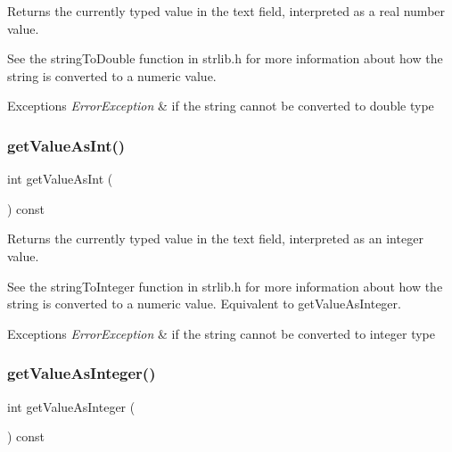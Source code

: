 Returns the currently typed value in the text field, interpreted as a real number value. 

See the string\+To\+Double function in strlib.\+h for more information about how the string is converted to a numeric value. 
\begin{DoxyExceptions}{Exceptions}
{\em Error\+Exception} & if the string cannot be converted to double type \\
\hline
\end{DoxyExceptions}
\mbox{\label{classsgl_1_1GTextField_a5e50caa202955b726a44a1dfbc6f7818}} 
\subsubsection{\texorpdfstring{get\+Value\+As\+Int()}{getValueAsInt()}}
{\footnotesize\ttfamily int get\+Value\+As\+Int (\begin{DoxyParamCaption}{ }\end{DoxyParamCaption}) const\hspace{0.3cm}{\ttfamily [virtual]}}



Returns the currently typed value in the text field, interpreted as an integer value. 

See the string\+To\+Integer function in strlib.\+h for more information about how the string is converted to a numeric value. Equivalent to get\+Value\+As\+Integer. 
\begin{DoxyExceptions}{Exceptions}
{\em Error\+Exception} & if the string cannot be converted to integer type \\
\hline
\end{DoxyExceptions}
\mbox{\label{classsgl_1_1GTextField_a1cbf643145c03ed4c238d085fc88cf33}} 
\subsubsection{\texorpdfstring{get\+Value\+As\+Integer()}{getValueAsInteger()}}
{\footnotesize\ttfamily int get\+Value\+As\+Integer (\begin{DoxyParamCaption}{ }\end{DoxyParamCaption}) const\hspace{0.3cm}{\ttfamily [virtual]}}



